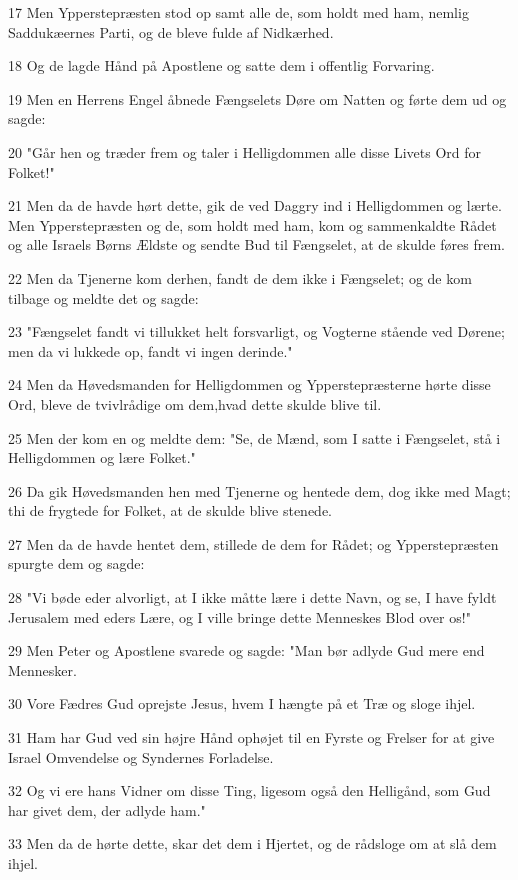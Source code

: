 \par 17 Men Ypperstepræsten stod op samt alle de, som holdt med ham, nemlig Saddukæernes Parti, og de bleve fulde af Nidkærhed.
\par 18 Og de lagde Hånd på Apostlene og satte dem i offentlig Forvaring.
\par 19 Men en Herrens Engel åbnede Fængselets Døre om Natten og førte dem ud og sagde:
\par 20 "Går hen og træder frem og taler i Helligdommen alle disse Livets Ord for Folket!"
\par 21 Men da de havde hørt dette, gik de ved Daggry ind i Helligdommen og lærte. Men Ypperstepræsten og de, som holdt med ham, kom og sammenkaldte Rådet og alle Israels Børns Ældste og sendte Bud til Fængselet, at de skulde føres frem.
\par 22 Men da Tjenerne kom derhen, fandt de dem ikke i Fængselet; og de kom tilbage og meldte det og sagde:
\par 23 "Fængselet fandt vi tillukket helt forsvarligt, og Vogterne stående ved Dørene; men da vi lukkede op, fandt vi ingen derinde."
\par 24 Men da Høvedsmanden for Helligdommen og Ypperstepræsterne hørte disse Ord, bleve de tvivlrådige om dem,hvad dette skulde blive til.
\par 25 Men der kom en og meldte dem: "Se, de Mænd, som I satte i Fængselet, stå i Helligdommen og lære Folket."
\par 26 Da gik Høvedsmanden hen med Tjenerne og hentede dem, dog ikke med Magt; thi de frygtede for Folket, at de skulde blive stenede.
\par 27 Men da de havde hentet dem, stillede de dem for Rådet; og Ypperstepræsten spurgte dem og sagde:
\par 28 "Vi bøde eder alvorligt, at I ikke måtte lære i dette Navn, og se, I have fyldt Jerusalem med eders Lære, og I ville bringe dette Menneskes Blod over os!"
\par 29 Men Peter og Apostlene svarede og sagde: "Man bør adlyde Gud mere end Mennesker.
\par 30 Vore Fædres Gud oprejste Jesus, hvem I hængte på et Træ og sloge ihjel.
\par 31 Ham har Gud ved sin højre Hånd ophøjet til en Fyrste og Frelser for at give Israel Omvendelse og Syndernes Forladelse.
\par 32 Og vi ere hans Vidner om disse Ting, ligesom også den Helligånd, som Gud har givet dem, der adlyde ham."
\par 33 Men da de hørte dette, skar det dem i Hjertet, og de rådsloge om at slå dem ihjel.
